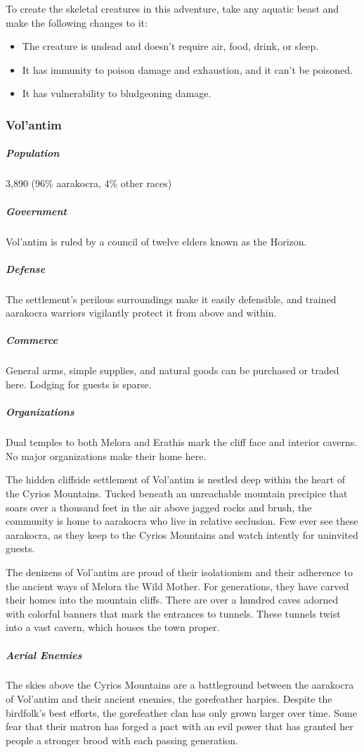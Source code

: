 \documentclass[10pt,a4paper,twoside,bg=print,twocolumn,openany,nodeprecatedcode]{dndbook}
\begin{document}
To create the skeletal creatures in this adventure, take any aquatic beast and make the following changes to it:


\begin{itemize}
\item The creature is undead and doesn't require air, food, drink, or sleep.
\item It has immunity to poison damage and exhaustion, and it can't be poisoned.
\item It has vulnerability to bludgeoning damage.
\end{itemize}

\subsubsection{Vol'antim}
\subparagraph{Population}
3,890 (96\% aarakocra, 4\% other races)

\subparagraph{Government}
Vol'antim is ruled by a council of twelve elders known as the Horizon.

\subparagraph{Defense}
The settlement's perilous surroundings make it easily defensible, and trained aarakocra warriors vigilantly protect it from above and within.

\subparagraph{Commerce}
General arms, simple supplies, and natural goods can be purchased or traded here. Lodging for guests is sparse.

\subparagraph{Organizations}
Dual temples to both Melora and Erathis mark the cliff face and interior caverns. No major organizations make their home here.

The hidden cliffside settlement of Vol'antim is nestled deep within the heart of the Cyrios Mountains. Tucked beneath an unreachable mountain precipice that soars over a thousand feet in the air above jagged rocks and brush, the community is home to aarakocra who live in relative seclusion. Few ever see these aarakocra, as they keep to the Cyrios Mountains and watch intently for uninvited guests.

The denizens of Vol'antim are proud of their isolationism and their adherence to the ancient ways of Melora the Wild Mother. For generations, they have carved their homes into the mountain cliffs. There are over a hundred caves adorned with colorful banners that mark the entrances to tunnels. These tunnels twist into a vast cavern, which houses the town proper.

\subparagraph{Aerial Enemies}
The skies above the Cyrios Mountains are a battleground between the aarakocra of Vol'antim and their ancient enemies, the gorefeather harpies. Despite the birdfolk's best efforts, the gorefeather clan has only grown larger over time. Some fear that their matron has forged a pact with an evil power that has granted her people a stronger brood with each passing generation.
\end{document}
